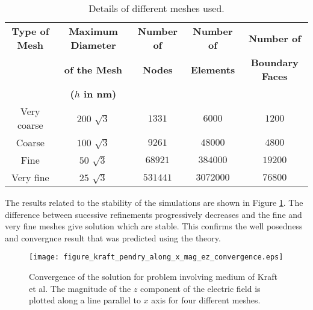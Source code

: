 \begin{table}[H]
  \centering
  
  \begin{tabular}{|c| c| c |c |c |}
    \toprule
   \textbf{ Type of Mesh }%
    & \textbf{Maximum Diameter} %
    & \textbf{Number of} %
    &\textbf{ Number of} %
    & \textbf{Number of}\\%
    & \textbf{of the Mesh } %
    & \textbf{Nodes}%
    &\textbf{ Elements} %
    & \textbf{Boundary Faces} \\ %
    & \textbf{($h$ in nm)} %
    &  %
    &  %
    & \\ %
    \midrule
    Very coarse%
    & $200$ $\sqrt{3}$ %
    & $1331$  %
    & $6000$ %
    & $1200$ \\ %
    Coarse %
    & $100$ $\sqrt{3}$%
    & $9261$ %
    & $48000$ %
    & $4800$\\ %
    Fine %
    & $50$ $\sqrt{3}$ %
    & $68921$ %
    & $384000$ %
    & $19200$ \\%
     Very fine %
    & $25$ $\sqrt{3}$%
    & $531441$%
    & $3072000$ %
    & $76800$  \\%
    \bottomrule
  \end{tabular}
  \caption{Details of different meshes used.}
  \label{ta:details_about_meshes}
\end{table}
%
The results related to the stability of the simulations are shown in Figure \ref{fi:kraft_pendry_convergence}.
The difference between sucessive refinements progressively decreases 
and the fine and very fine meshes give solution which are stable.
This confirms the well posedness and convergnce result that was predicted 
using the theory.
  
\begin{figure}
\texttt{[image: figure\_kraft\_pendry\_along\_x\_mag\_ez\_convergence.eps]}
\caption{Convergence of the solution for problem involving medium of Kraft et al.
The magnitude of the $z$ component of the electric field is plotted 
along a line parallel to $x$ axis for four different meshes.}
\label{fi:kraft_pendry_convergence}
\end{figure}

